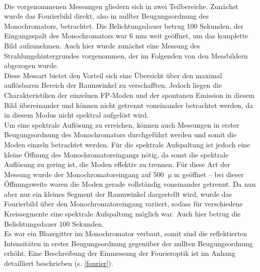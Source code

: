 \\
Die vorgenommenen Messungen gliedern sich in zwei Teilbereiche. Zunächst wurde das Fourierbild direkt, also in nullter Beugungsordnung des Monochromators, betrachtet. Die Belichtungsdauer betrug 100 Sekunden, der Eingangsspalt des Monochromators war 6 mm weit geöffnet, um das komplette Bild aufzunehmen. Auch hier wurde zunächst eine Messung des Strahlungshintergrundes vorgenommen, der im Folgenden von den Messbildern abgezogen wurde.\\
Diese Messart bietet den Vorteil sich eine Übersicht über den maximal auflösbaren Bereich der Raumwinkel zu verschafften. Jedoch liegen die Charakteristiken der einzelnen FP-Moden und der spontanen Emission in diesem Bild übereinander und können nicht getrennt voneinander betrachtet werden, da in diesem Modus nicht spektral aufgelöst wird.\\
Um eine spektrale Auflösung zu erreichen, können auch Messungen in erster Beugungsordnung des Monochromators durchgeführt werden und somit die Moden einzeln betrachtet werden. Für die spektrale Aufspaltung ist jedoch eine kleine Öffnung des Monochromatoreingangs nötig, da sonst die spektrale Auflösung zu gering ist, die Moden effektiv zu trennen. Für diese Art der Messung wurde der Monochromatoreingang auf 500 $\upmu$m geöffnet – bei dieser Öffnungsweite waren die Moden gerade vollständig voneinander getrennt. Da nun aber nur ein kleines Segment der Raumwinkel dargestellt wird, wurde das Fourierbild über den Monochromatoreingang variiert, sodass für verschiedene Kreissegmente eine spektrale Aufspaltung möglich war. Auch hier betrug die Belichtungsdauer 100 Sekunden.\\
Es war ein Blazegitter im Monochromator verbaut, somit sind die reflektierten Intensitäten in erster Beugungsordnung gegenüber der nullten Beugungsordnung erhöht. Eine Beschreibung der Einmessung der Fourieroptik ist im Anhang detailliert beschrieben (s. \autoref{fourier}).
